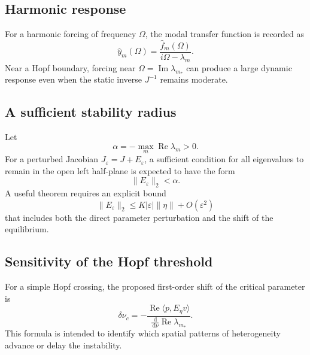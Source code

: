 \documentclass[11pt, reqno]{amsart}
\theoremstyle{definition}
\theoremstyle{remark}
\newcommand{\eps}{\varepsilon}
\newcommand{\Ree}{\operatorname{Re}}
\newcommand{\Imm}{\operatorname{Im}}
\newcommand{\dd}{\,\mathrm{d}}
\begin{document}
	
	\subsection{Harmonic response}
	
	For a harmonic forcing of frequency $\Omega$, the modal transfer function is
	recorded as
	\begin{equation}
		\label{eq:harmonic-response}
		\widehat y_m(\Omega)
		=
		\frac{\widehat f_m(\Omega)}{i\Omega-\lambda_m}.
	\end{equation}
	Near a Hopf boundary, forcing near
	$\Omega=\Imm\lambda_{m_*}$ can produce a large dynamic response even when the
	static inverse $J^{-1}$ remains moderate.
	
	
	\subsection{A sufficient stability radius}
	
	Let
	\begin{equation}
		\label{eq:stability-margin}
		\alpha
		=
		-\max_m\Ree\lambda_m>0.
	\end{equation}
	For a perturbed Jacobian $J_\eps=J+E_\eps$, a sufficient condition for all
	eigenvalues to remain in the open left half-plane is expected to have the form
	\begin{equation}
		\label{eq:stability-radius}
		\|E_\eps\|_2<\alpha.
	\end{equation}
	A useful theorem requires an explicit bound
	\[
	\|E_\eps\|_2
	\le
	K|\eps|\|\eta\|+O(\eps^2)
	\]
	that includes both the direct parameter perturbation and the shift of the
	equilibrium.
	
	
	\subsection{Sensitivity of the Hopf threshold}
	
	For a simple Hopf crossing, the proposed first-order shift of the critical
	parameter is
	\begin{equation}
		\label{eq:hopf-threshold-shift}
		\delta\nu_c
		=
		-
		\frac{
			\Ree\langle p,E_\eta v\rangle
		}{
			\frac{\dd}{\dd\nu}\Ree\lambda_{m_*}
		}.
	\end{equation}
	This formula is intended to identify which spatial patterns of heterogeneity
	advance or delay the instability.
	
\end{document}
